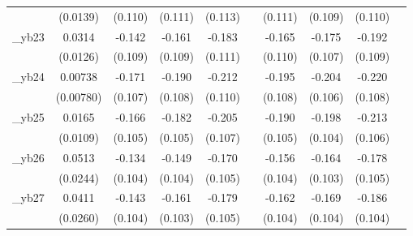 \begin{table}[htbp]
\begin{tabular}{l*{9}{c}}
            &    (0.0139)         &     (0.110)         &     (0.111)         &     (0.113)         &                     &     (0.111)         &     (0.109)         &     (0.110)         &                     \\
[1em]
\_yb23       &      0.0314\sym{**} &      -0.142         &      -0.161         &      -0.183\sym{*}  &                     &      -0.165         &      -0.175         &      -0.192\sym{*}  &                     \\
            &    (0.0126)         &     (0.109)         &     (0.109)         &     (0.111)         &                     &     (0.110)         &     (0.107)         &     (0.109)         &                     \\
[1em]
\_yb24       &     0.00738         &      -0.171         &      -0.190\sym{*}  &      -0.212\sym{*}  &                     &      -0.195\sym{*}  &      -0.204\sym{*}  &      -0.220\sym{**} &                     \\
            &   (0.00780)         &     (0.107)         &     (0.108)         &     (0.110)         &                     &     (0.108)         &     (0.106)         &     (0.108)         &                     \\
[1em]
\_yb25       &      0.0165         &      -0.166         &      -0.182\sym{*}  &      -0.205\sym{*}  &                     &      -0.190\sym{*}  &      -0.198\sym{*}  &      -0.213\sym{**} &                     \\
            &    (0.0109)         &     (0.105)         &     (0.105)         &     (0.107)         &                     &     (0.105)         &     (0.104)         &     (0.106)         &                     \\
[1em]
\_yb26       &      0.0513\sym{**} &      -0.134         &      -0.149         &      -0.170         &                     &      -0.156         &      -0.164         &      -0.178\sym{*}  &                     \\
            &    (0.0244)         &     (0.104)         &     (0.104)         &     (0.105)         &                     &     (0.104)         &     (0.103)         &     (0.105)         &                     \\
[1em]
\_yb27       &      0.0411         &      -0.143         &      -0.161         &      -0.179\sym{*}  &                     &      -0.162         &      -0.169         &      -0.186\sym{*}  &                     \\
            &    (0.0260)         &     (0.104)         &     (0.103)         &     (0.105)         &                     &     (0.104)         &     (0.104)         &     (0.104)         &                     \\

\end{tabular}
\end{table}
